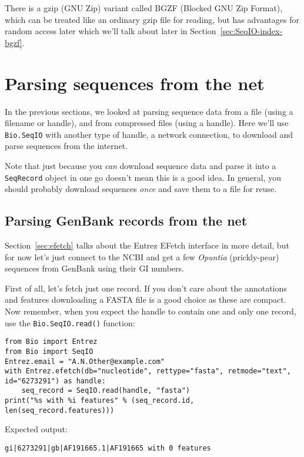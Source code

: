 There is a gzip (GNU Zip) variant called BGZF (Blocked GNU Zip Format),
which can be treated like an ordinary gzip file for reading, but has
advantages for random access later which we'll talk about later in
Section~\ref{sec:SeqIO-index-bgzf}.

\section{Parsing sequences from the net}
\label{sec:SeqIO_Online}
In the previous sections, we looked at parsing sequence data from a file
(using a filename or handle), and from compressed files (using a handle).
Here we'll use \verb|Bio.SeqIO| with another type of handle, a network
connection, to download and parse sequences from the internet.

Note that just because you \emph{can} download sequence data and parse it into
a \verb|SeqRecord| object in one go doesn't mean this is a good idea.
In general, you should probably download sequences \emph{once} and save them to
a file for reuse.

\subsection{Parsing GenBank records from the net}
\label{sec:SeqIO_GenBank_Online}
Section~\ref{sec:efetch} talks about the Entrez EFetch interface in more detail,
but for now let's just connect to the NCBI and get a few \textit{Opuntia} (prickly-pear)
sequences from GenBank using their GI numbers.

First of all, let's fetch just one record.  If you don't care about the
annotations and features downloading a FASTA file is a good choice as these
are compact.  Now remember, when you expect the handle to contain one and
only one record, use the \verb|Bio.SeqIO.read()| function:

\begin{verbatim}
from Bio import Entrez
from Bio import SeqIO
Entrez.email = "A.N.Other@example.com"
with Entrez.efetch(db="nucleotide", rettype="fasta", retmode="text", id="6273291") as handle:
    seq_record = SeqIO.read(handle, "fasta")
print("%s with %i features" % (seq_record.id, len(seq_record.features)))
\end{verbatim}

\noindent Expected output:

\begin{verbatim}
gi|6273291|gb|AF191665.1|AF191665 with 0 features
\end{verbatim}

